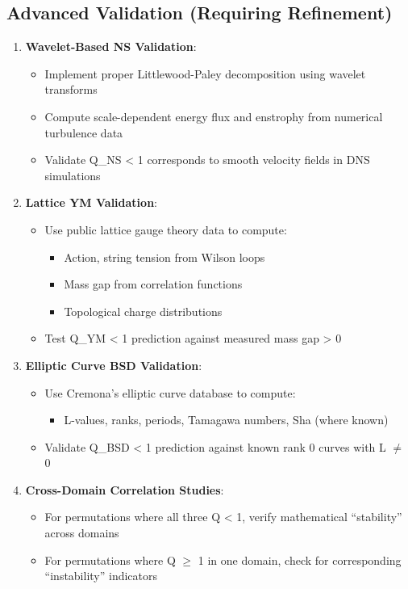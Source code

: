 \documentclass[11pt]{article}
\begin{document}
\subsection{Advanced Validation (Requiring Refinement)}
\begin{enumerate}
\item \textbf{Wavelet-Based NS Validation}:
  \begin{itemize}
  \item Implement proper Littlewood-Paley decomposition using wavelet transforms
  \item Compute scale-dependent energy flux and enstrophy from numerical turbulence data
  \item Validate Q\_NS < 1 corresponds to smooth velocity fields in DNS simulations
  \end{itemize}
\item \textbf{Lattice YM Validation}:
  \begin{itemize}
  \item Use public lattice gauge theory data to compute:
    \begin{itemize}
    \item Action, string tension from Wilson loops
    \item Mass gap from correlation functions
    \item Topological charge distributions
    \end{itemize}
  \item Test Q\_YM < 1 prediction against measured mass gap > 0
  \end{itemize}
\item \textbf{Elliptic Curve BSD Validation}:
  \begin{itemize}
  \item Use Cremona's elliptic curve database to compute:
    \begin{itemize}
    \item L-values, ranks, periods, Tamagawa numbers, Sha (where known)
    \end{itemize}
  \item Validate Q\_BSD < 1 prediction against known rank 0 curves with L $\neq$ 0
  \end{itemize}
\item \textbf{Cross-Domain Correlation Studies}:
  \begin{itemize}
  \item For permutations where all three Q < 1, verify mathematical ``stability'' across domains
  \item For permutations where Q $\geq$ 1 in one domain, check for corresponding ``instability'' indicators
  \end{itemize}
\end{enumerate}
\end{document}
